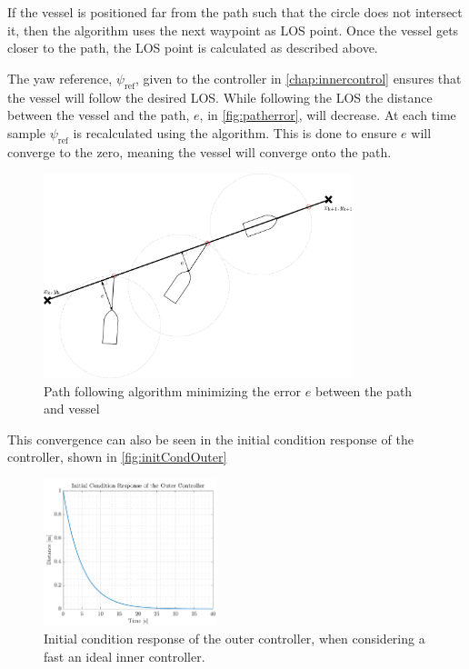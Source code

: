 If the vessel is positioned far from the path such that the circle does not intersect it, then the algorithm uses the next waypoint as LOS point. Once the vessel gets closer to the path, the LOS point is calculated as described above.

The yaw reference, $\psi_\mathrm{ref}$, given to the controller in \autoref{chap:innercontrol} ensures that the vessel will follow the desired LOS. While following the LOS the distance between the vessel and the path, $e$, in \autoref{fig:patherror}, will decrease. At each time sample $\psi_\mathrm{ref}$ is recalculated using the algorithm. This is done to ensure $e$ will converge to the zero, meaning the vessel will converge onto the path.
%
\begin{figure}[H]
	\includegraphics[width=0.8\textwidth]{figures/patherror}
	\caption{Path following algorithm minimizing the error $e$ between the path and vessel}
	\label{fig:patherror}
\end{figure}
%

This convergence can also be seen in the initial condition response of the controller, shown in \autoref{fig:initCondOuter}
%
\begin{figure}[H]
    \includegraphics[width=0.45\textwidth]{figures/initCondOuter}
    \caption{Initial condition response of the outer controller, when considering a fast an ideal inner controller.}
    \label{fig:initCondOuter}
\end{figure}




